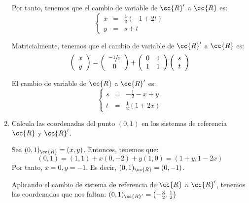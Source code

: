 \begin{ejercicio}
\begin{enumerate}
        Por tanto, tenemos que el cambio de variable de $\cc{R}'$ a $\cc{R}$ es:
        \begin{equation*}
            \left\{
            \begin{array}{lll}
                x & = & \frac{1}{2}(-1+2t) \\
                y & = & s+t
            \end{array}
            \right.
        \end{equation*}

        Matricialmente, tenemos que el cambio de variable de $\cc{R}'$ a $\cc{R}$ es:
        \begin{equation*}
            \left(\begin{array}{c}
                x \\ y
            \end{array}\right)
            = 
            \left(\begin{array}{c}
                \nicefrac{-1}{2}\\ 0
            \end{array}\right)
            +
            \left(\begin{array}{ccc}
                0 & 1 \\
                1 & 1
            \end{array}\right)
            \left(\begin{array}{c}
                s \\ t
            \end{array}\right)
        \end{equation*}

        El cambio de variable de $\cc{R}$ a $\cc{R}'$ es:
        \begin{equation*}
            \left\{
            \begin{array}{lll}
                s & = & -\frac{1}{2}-x+y \\
                t & = & \frac{1}{2}(1+2x)
            \end{array}
            \right.
        \end{equation*}
        
        
        \item Calcula las coordenadas del punto $(0, 1)$ en los sistemas de referencia $\cc{R}$ y $\cc{R}'$.

        Sea $(0,1)_{\cc{R}}=(x,y)$. Entonces, tenemos que:
        \begin{equation*}
            (0,1)=(1,1) +x(0,-2) +y(1,0) = (1+y, 1-2x)
        \end{equation*}
        Por tanto, $x=0,y=-1$. Es decir, $(0,1)_{\cc{R}}=(0,-1)$.

        Aplicando el cambio de sistema de referencia de $\cc{R}$ a $\cc{R}'$, tenemos las coordenadas que nos faltan: $(0,1)_{\cc{R}'}=\left(-\frac{3}{2},\frac{1}{2}\right)$
    \end{enumerate}
\end{ejercicio}

